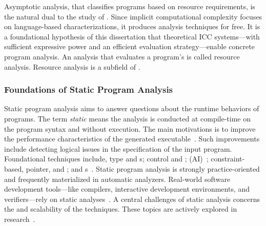 Asymptotic analysis, that classifies programs based
on resource requirements, is the natural dual to the study
of . Since implicit computational complexity focuses on
language-based characterizations, it produces analysis techniques for free. It
is a foundational hypothesis of this dissertation that theoretical ICC
systems---with sufficient expressive power and an
efficient evaluation strategy---enable concrete program analysis. An analysis
that evaluates a program's  is called resource analysis.
Resource analysis is a subfield of .

\subsubsection{Foundations of Static Program Analysis}
\label{static-analysis-basics}

Static program analysis aims to answer questions about the runtime behaviors of
programs. The term \emph{static} means the analysis is conducted at compile-time
on the program syntax and without execution. The main motivations is to improve
the performance characteristics of the generated
executable~\cite{nielson2010,kennedy2001}. Such improvements include detecting
logical issues in the specification of the input program. Foundational
techniques include, \eg type and s;
control and ;  (AI)~\cite{cousot2021}; constraint-based, pointer, and ;
and s~\cite{nielson2010,moller2023}. Static program
analysis is strongly practice-oriented and frequently materialized in automatic
analyzers. Real-world software development tools---like compilers, interactive
development environments, and verifiers---rely on static
analyses~\cite{livshits2015}. A central challenges of static analysis concerns
the  and scalability of the techniques. These topics are actively
explored in research~\cite{schiebel2024,dudina2025,arzt2014}.

